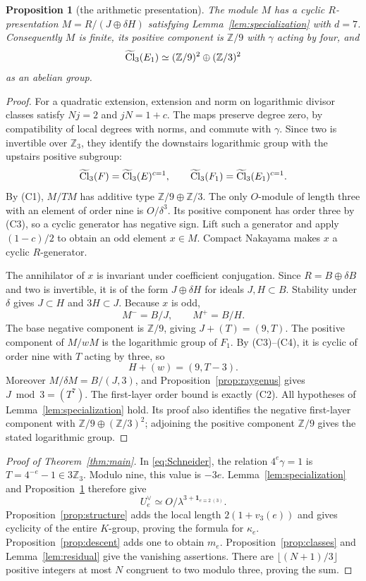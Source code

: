 \documentclass[11pt]{article}
\newtheorem{proposition}[theorem]{Proposition}
\theoremstyle{remark}\newtheorem{remark}[theorem]{Remark}
\newcommand{\Z}{\mathbb Z}\newcommand{\Q}{\mathbb Q}\newcommand{\F}{\mathbb F}
\newcommand{\ind}{\mathbf1}
\begin{document}
\begin{proposition}[the arithmetic presentation]
\label{prop:arithmeticpresentation}
The module $M$ has a cyclic $R$-presentation $M=R/(J\oplus\delta H)$ satisfying Lemma~\ref{lem:specialization} with $d=7$.
Consequently $M$ is finite, its positive component is $\Z/9$ with $\gamma$ acting by four, and
\[
 \lc(E_1)\simeq(\Z/9)^2\oplus(\Z/3)^2
\]
as an abelian group.
\end{proposition}
\begin{proof}
For a quadratic extension, extension and norm on logarithmic divisor classes satisfy $Nj=2$ and $jN=1+c$.
The maps preserve degree zero, by compatibility of local degrees with norms, and commute with $\gamma$.
Since two is invertible over $\Z_3$, they identify the downstairs logarithmic group with the upstairs positive subgroup:
\[
 \widetilde{\operatorname{Cl}}_3(F)=\widetilde{\operatorname{Cl}}_3(E)^{c=1},\qquad\widetilde{\operatorname{Cl}}_3(F_1)=\widetilde{\operatorname{Cl}}_3(E_1)^{c=1}.
\]
By (C1), $M/TM$ has additive type $\Z/9\oplus\Z/3$.
The only $O$-module of length three with an element of order nine is $O/\delta^3$.
Its positive component has order three by (C3), so a cyclic generator has negative sign.
Lift such a generator and apply $(1-c)/2$ to obtain an odd element $x\in M$.
Compact Nakayama makes $x$ a cyclic $R$-generator.

The annihilator of $x$ is invariant under coefficient conjugation.
Since $R=B\oplus\delta B$ and two is invertible, it is of the form $J\oplus\delta H$ for ideals $J,H\subset B$.
Stability under $\delta$ gives $J\subset H$ and $3H\subset J$.
Because $x$ is odd,
\[
 M^-=B/J,\qquad M^+=B/H.
\]
The base negative component is $\Z/9$, giving $J+(T)=(9,T)$.
The positive component of $M/wM$ is the logarithmic group of $F_1$.
By (C3)--(C4), it is cyclic of order nine with $T$ acting by three, so
\[
 H+(w)=(9,T-3).
\]
Moreover $M/\delta M=B/(J,3)$, and Proposition~\ref{prop:raygenus} gives $J\bmod3=(T^7)$.
The first-layer order bound is exactly (C2).
All hypotheses of Lemma~\ref{lem:specialization} hold.
Its proof also identifies the negative first-layer component with $\Z/9\oplus(\Z/3)^2$; adjoining the positive component $\Z/9$ gives the stated logarithmic group.
\end{proof}

\begin{proof}[Proof of Theorem~\ref{thm:main}]
In \eqref{eq:Schneider}, the relation $4^e\gamma=1$ is $T=4^{-e}-1\in3\Z_3$.
Modulo nine, this value is $-3e$.
Lemma~\ref{lem:specialization} and Proposition~\ref{prop:arithmeticpresentation} therefore give
\[
 U_e^\vee\simeq O/\lambda^{3+\ind_{e\equiv2\ (3)}}.
\]
Proposition~\ref{prop:structure} adds the local length $2(1+v_3(e))$ and gives cyclicity of the entire $K$-group, proving the formula for $\kappa_e$.
Proposition~\ref{prop:descent} adds one to obtain $m_e$.
Proposition~\ref{prop:classes} and Lemma~\ref{lem:residual} give the vanishing assertions.
There are $\lfloor(N+1)/3\rfloor$ positive integers at most $N$ congruent to two modulo three, proving the sum.
\end{proof}
\end{document}
